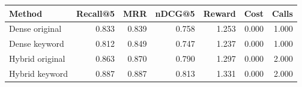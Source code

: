 \begin{tabular}{lrrrrrr}
\toprule
Method & Recall@5 & MRR & nDCG@5 & Reward & Cost & Calls \\
\midrule
Dense original & 0.833 & 0.839 & 0.758 & 1.253 & 0.000 & 1.000 \\
Dense keyword & 0.812 & 0.849 & 0.747 & 1.237 & 0.000 & 1.000 \\
Hybrid original & 0.863 & 0.870 & 0.790 & 1.297 & 0.000 & 2.000 \\
Hybrid keyword & 0.887 & 0.887 & 0.813 & 1.331 & 0.000 & 2.000 \\
\bottomrule
\end{tabular}
